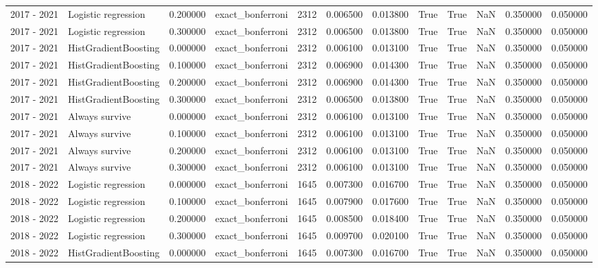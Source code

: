\begin{tabular}{llrlrrrrrrrr}
2017 - 2021 & Logistic regression & 0.200000 & exact_bonferroni & 2312 & 0.006500 & 0.013800 & True & True & NaN & 0.350000 & 0.050000 \\
2017 - 2021 & Logistic regression & 0.300000 & exact_bonferroni & 2312 & 0.006500 & 0.013800 & True & True & NaN & 0.350000 & 0.050000 \\
2017 - 2021 & HistGradientBoosting & 0.000000 & exact_bonferroni & 2312 & 0.006100 & 0.013100 & True & True & NaN & 0.350000 & 0.050000 \\
2017 - 2021 & HistGradientBoosting & 0.100000 & exact_bonferroni & 2312 & 0.006900 & 0.014300 & True & True & NaN & 0.350000 & 0.050000 \\
2017 - 2021 & HistGradientBoosting & 0.200000 & exact_bonferroni & 2312 & 0.006900 & 0.014300 & True & True & NaN & 0.350000 & 0.050000 \\
2017 - 2021 & HistGradientBoosting & 0.300000 & exact_bonferroni & 2312 & 0.006500 & 0.013800 & True & True & NaN & 0.350000 & 0.050000 \\
2017 - 2021 & Always survive & 0.000000 & exact_bonferroni & 2312 & 0.006100 & 0.013100 & True & True & NaN & 0.350000 & 0.050000 \\
2017 - 2021 & Always survive & 0.100000 & exact_bonferroni & 2312 & 0.006100 & 0.013100 & True & True & NaN & 0.350000 & 0.050000 \\
2017 - 2021 & Always survive & 0.200000 & exact_bonferroni & 2312 & 0.006100 & 0.013100 & True & True & NaN & 0.350000 & 0.050000 \\
2017 - 2021 & Always survive & 0.300000 & exact_bonferroni & 2312 & 0.006100 & 0.013100 & True & True & NaN & 0.350000 & 0.050000 \\
2018 - 2022 & Logistic regression & 0.000000 & exact_bonferroni & 1645 & 0.007300 & 0.016700 & True & True & NaN & 0.350000 & 0.050000 \\
2018 - 2022 & Logistic regression & 0.100000 & exact_bonferroni & 1645 & 0.007900 & 0.017600 & True & True & NaN & 0.350000 & 0.050000 \\
2018 - 2022 & Logistic regression & 0.200000 & exact_bonferroni & 1645 & 0.008500 & 0.018400 & True & True & NaN & 0.350000 & 0.050000 \\
2018 - 2022 & Logistic regression & 0.300000 & exact_bonferroni & 1645 & 0.009700 & 0.020100 & True & True & NaN & 0.350000 & 0.050000 \\
2018 - 2022 & HistGradientBoosting & 0.000000 & exact_bonferroni & 1645 & 0.007300 & 0.016700 & True & True & NaN & 0.350000 & 0.050000 \\

\end{tabular}
